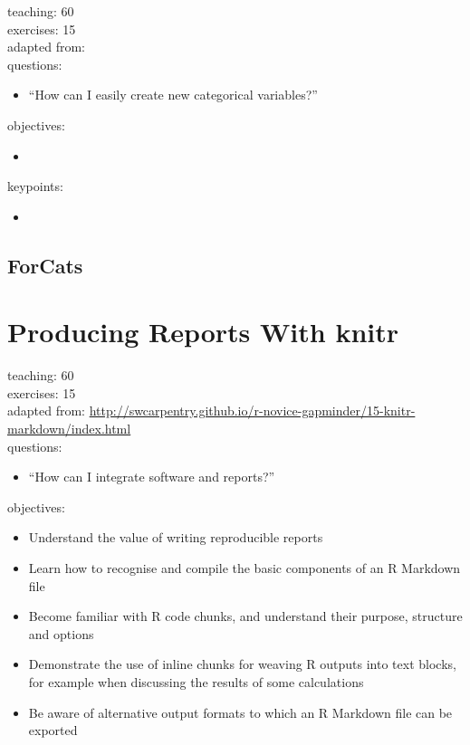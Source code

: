 \documentclass[]{book}
\providecommand{\tightlist}{%
  \setlength{\itemsep}{0pt}\setlength{\parskip}{0pt}}
\begin{document}
teaching: 60\\
exercises: 15\\
adapted from:\\
questions:

\begin{itemize}
\tightlist
\item
  ``How can I easily create new categorical variables?''
\end{itemize}

objectives:

\begin{itemize}
\item
\end{itemize}

keypoints:

\begin{itemize}
\item
\end{itemize}

\section{ForCats}\label{forcats}

\chapter{Producing Reports With
knitr}\label{producing-reports-with-knitr}

teaching: 60\\
exercises: 15\\
adapted from:
\url{http://swcarpentry.github.io/r-novice-gapminder/15-knitr-markdown/index.html}\\
questions:

\begin{itemize}
\tightlist
\item
  ``How can I integrate software and reports?''
\end{itemize}

objectives:

\begin{itemize}
\tightlist
\item
  Understand the value of writing reproducible reports\\
\item
  Learn how to recognise and compile the basic components of an R
  Markdown file\\
\item
  Become familiar with R code chunks, and understand their purpose,
  structure and options\\
\item
  Demonstrate the use of inline chunks for weaving R outputs into text
  blocks, for example when discussing the results of some calculations\\
\item
  Be aware of alternative output formats to which an R Markdown file can
  be exported
\end{itemize}
\end{document}
